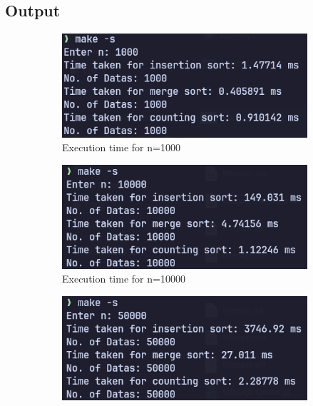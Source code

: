 \subsection{Output}
\begin{figure}[H]
    \centering
    \begin{subfigure}[b]{0.4\textwidth}
        \centering
        \includegraphics[width=\textwidth]{./img/out-1.png}
        \caption{Execution time for n=1000}
    \end{subfigure}
    \hfill
    \begin{subfigure}[b]{0.4\textwidth}
        \centering
        \includegraphics[width=\textwidth]{./img/out-2.png}
        \caption{Execution time for n=10000}
    \end{subfigure}
    \hfill
    \begin{subfigure}[b]{0.4\textwidth}
        \centering
        \includegraphics[width=\textwidth]{./img/out-3.png}

\end{subfigure}
\end{figure}
